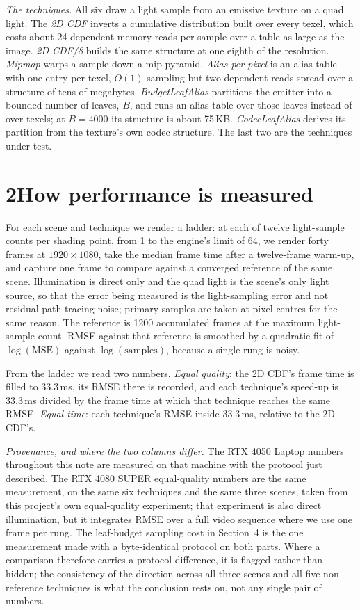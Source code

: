 \documentclass[10pt]{article}
\begin{document}
\emph{The techniques.} All six draw a light sample from an emissive texture on a quad light. The
\emph{2D CDF} inverts a cumulative distribution built over every texel, which costs about 24
dependent memory reads per sample over a table as large as the image. \emph{2D CDF/8} builds the
same structure at one eighth of the resolution. \emph{Mipmap} warps a sample down a mip pyramid.
\emph{Alias per pixel} is an alias table with one entry per texel, $O(1)$ sampling but two dependent
reads spread over a structure of tens of megabytes. \emph{BudgetLeafAlias} partitions the emitter
into a bounded number of leaves, $B$, and runs an alias table over those leaves instead of over
texels; at $B=4000$ its structure is about 75\,KB. \emph{CodecLeafAlias} derives its partition from
the texture's own codec structure. The last two are the techniques under test.

\section*{2\quad How performance is measured}

For each scene and technique we render a ladder: at each of twelve light-sample counts per shading
point, from 1 to the engine's limit of 64, we render forty frames at $1920\times1080$, take the
median frame time after a twelve-frame warm-up, and capture one frame to compare against a converged
reference of the same scene. Illumination is direct only and the quad light is the scene's only
light source, so that the error being measured is the light-sampling error and not residual
path-tracing noise; primary samples are taken at pixel centres for the same reason. The reference is
1200 accumulated frames at the maximum light-sample count. RMSE against that reference is smoothed
by a quadratic fit of $\log(\mathrm{MSE})$ against $\log(\mathrm{samples})$, because a single rung is
noisy.

From the ladder we read two numbers. \emph{Equal quality}: the 2D CDF's frame time is filled to
33.3\,ms, its RMSE there is recorded, and each technique's speed-up is 33.3\,ms divided by the frame
time at which that technique reaches the same RMSE. \emph{Equal time}: each technique's RMSE inside
33.3\,ms, relative to the 2D CDF's.

\emph{Provenance, and where the two columns differ.} The RTX 4050 Laptop numbers throughout this note
are measured on that machine with the protocol just described. The RTX 4080 SUPER equal-quality
numbers are the same measurement, on the same six techniques and the same three scenes, taken from
this project's own equal-quality experiment; that experiment is also direct illumination, but it
integrates RMSE over a full video sequence where we use one frame per rung. The leaf-budget
sampling cost in Section~4 is the one measurement made with a byte-identical protocol on both
parts. Where a comparison therefore carries a protocol difference, it is flagged rather than hidden;
the consistency of the direction across all three scenes and all five non-reference techniques is
what the conclusion rests on, not any single pair of numbers.
\end{document}
